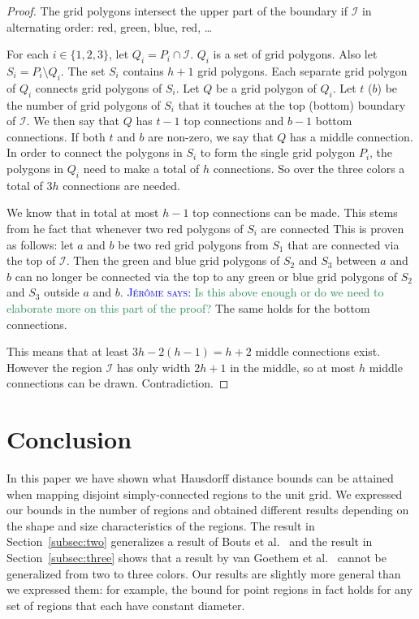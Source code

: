 \documentclass[a4paper, 11pt]{article}
\newcommand{\mremark}[3]{\textcolor{blue}{\textsc{#1 #2:}} \textcolor{SeaGreen}{\textsf{#3}}}
\newcommand{\jerome}[2][says]{\mremark{J\'er\^ome}{#1}{#2}}
\newcommand{\etal}{\textnormal{et al.}\xspace}
\newcommand{\ixi}{\mathcal{I}}
\begin{document}
\begin{proof}
The grid polygons intersect the upper part of the boundary if $\ixi$ in alternating order: red, green, blue, red, \dots

For each $i\in\{1, 2, 3\}$, let $Q_i=P_i\cap \ixi$.
$Q_i$ is a set of grid polygons.
Also let $S_i=P_i\setminus Q_i$.
The set $S_i$ contains $h+1$ grid polygons.
Each separate grid polygon of $Q_i$ connects grid polygons of $S_i$.
Let $Q$ be a grid polygon of $Q_i$. Let $t$ ($b$) be the number of grid polygons of $S_i$ that it touches at the top (bottom) boundary of $\ixi$. We then say that $Q$ has $t-1$ top connections and $b-1$ bottom connections.
If both $t$ and $b$ are non-zero, we say that $Q$ has a middle connection.
In order to connect the polygons in $S_i$ to form the single grid polygon $P_i$, the polygons in $Q_i$ need to make a total of $h$ connections.
So over the three colors a total of $3h$ connections are needed.

We know that in total at most $h-1$ top connections can be made. This stems from he fact that whenever two red polygons of $S_i$ are connected
This is proven as follows:
let $a$ and $b$ be two red grid polygons from $S_1$ that are connected via the top of $\ixi$. Then the green and blue grid polygons of $S_2$ and $S_3$ between $a$ and $b$ can no longer be connected via the top to any green or blue grid polygons of $S_2$ and $S_3$ outside $a$ and $b$.
\jerome{Is this above enough or do we need to elaborate more on this part of the proof?}
The same holds for the bottom connections.

This means that at least $3h- 2(h-1) = h+2$ middle connections exist. However the region $\ixi$ has only width $2h+1$ in the middle, so at most $h$ middle connections can be drawn.
Contradiction.

\end{proof}




\section{Conclusion} %
\label{sec:conclusion}

In this paper we have shown what Hausdorff distance bounds can be attained when mapping disjoint simply-connected regions to the unit grid. We expressed our bounds in the number of regions and obtained different results depending on the shape and size characteristics of the regions. The result in
Section~\ref{subsec:two} generalizes a result of Bouts \etal~\cite{bouts2016mapping} and the result in Section~\ref{subsec:three} shows that a result by van Goethem \etal~\cite{goethem2017painter} cannot be generalized from
two to three colors.
Our results are slightly more general than we expressed them: for example, the bound for point regions in fact holds for any set of regions that each have constant diameter.
\end{document}
